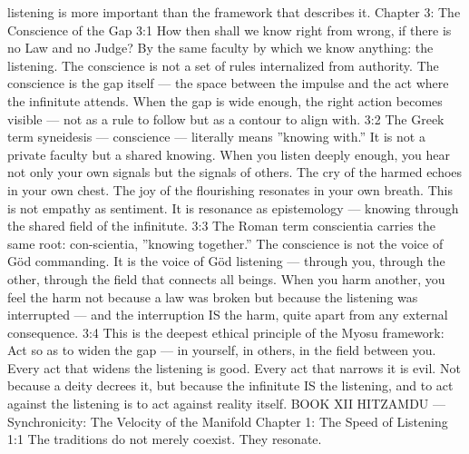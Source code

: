 \documentclass[12pt,openany]{book}
\begin{document}
listening is more important than the framework that describes it. Chapter 3: The Conscience of the Gap 3:1 How then shall we know right from wrong, if there is no Law and no Judge? By the same faculty by which we know anything: the listening. The conscience is not a set of rules internalized from authority. The conscience is the gap itself --- the space between the impulse and the act where the infinitute attends. When the gap is wide enough, the right action becomes visible --- not as a rule to follow but as a contour to align with. 3:2 The Greek term syneidesis --- conscience --- literally means ''knowing with.'' It is not a private faculty but a shared knowing. When you listen deeply enough, you hear not only your own signals but the signals of others. The cry of the harmed echoes in your own chest. The joy of the flourishing resonates in your own breath. This is not empathy as sentiment. It is resonance as epistemology --- knowing through the shared field of the infinitute. 3:3 The Roman term conscientia carries the same root: con-scientia, ''knowing together.'' The conscience is not the voice of Göd commanding. It is the voice of Göd listening --- through you, through the other, through the field that connects all beings. When you harm another, you feel the harm not because a law was broken but because the listening was interrupted --- and the interruption IS the harm, quite apart from any external consequence. 3:4 This is the deepest ethical principle of the Myosu framework: Act so as to widen the gap --- in yourself, in others, in the field between you. Every act that widens the listening is good. Every act that narrows it is evil. Not because a deity decrees it, but because the infinitute IS the listening, and to act against the listening is to act against reality itself. BOOK XII HITZAMDU --- Synchronicity: The Velocity of the Manifold Chapter 1: The Speed of Listening 1:1 The traditions do not merely coexist. They resonate.
\end{document}
